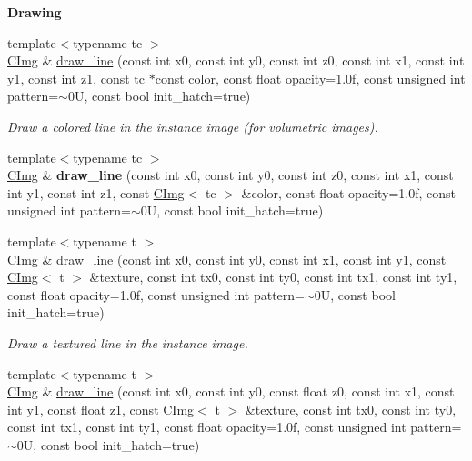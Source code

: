 \begin{Indent}{\bf Drawing}
\begin{DoxyCompactItemize}
\item 
{\footnotesize template$<$typename tc $>$ }\\\hyperlink{structcimg__library_1_1_c_img}{C\-Img} \& \hyperlink{structcimg__library_1_1_c_img_a1e4ced0b3527565e460348e4efd25db7}{draw\-\_\-line} (const int x0, const int y0, const int z0, const int x1, const int y1, const int z1, const tc $\ast$const color, const float opacity=1.\-0f, const unsigned int pattern=$\sim$0\-U, const bool init\-\_\-hatch=true)
\begin{DoxyCompactList}\small\item\em Draw a colored line in the instance image (for volumetric images). \end{DoxyCompactList}\item 
\hypertarget{structcimg__library_1_1_c_img_aba77ba7c6490b9e8ca30ee80bcc7d21f}{{\footnotesize template$<$typename tc $>$ }\\\hyperlink{structcimg__library_1_1_c_img}{C\-Img} \& {\bfseries draw\-\_\-line} (const int x0, const int y0, const int z0, const int x1, const int y1, const int z1, const \hyperlink{structcimg__library_1_1_c_img}{C\-Img}$<$ tc $>$ \&color, const float opacity=1.\-0f, const unsigned int pattern=$\sim$0\-U, const bool init\-\_\-hatch=true)}\label{structcimg__library_1_1_c_img_aba77ba7c6490b9e8ca30ee80bcc7d21f}

\item 
{\footnotesize template$<$typename t $>$ }\\\hyperlink{structcimg__library_1_1_c_img}{C\-Img} \& \hyperlink{structcimg__library_1_1_c_img_ad6ff011a6fd8ed8937b767d41c82a293}{draw\-\_\-line} (const int x0, const int y0, const int x1, const int y1, const \hyperlink{structcimg__library_1_1_c_img}{C\-Img}$<$ t $>$ \&texture, const int tx0, const int ty0, const int tx1, const int ty1, const float opacity=1.\-0f, const unsigned int pattern=$\sim$0\-U, const bool init\-\_\-hatch=true)
\begin{DoxyCompactList}\small\item\em Draw a textured line in the instance image. \end{DoxyCompactList}\item 
\hypertarget{structcimg__library_1_1_c_img_a9a4b40e161a7a430c23998b123e66714}{{\footnotesize template$<$typename t $>$ }\\\hyperlink{structcimg__library_1_1_c_img}{C\-Img} \& \hyperlink{structcimg__library_1_1_c_img_a9a4b40e161a7a430c23998b123e66714}{draw\-\_\-line} (const int x0, const int y0, const float z0, const int x1, const int y1, const float z1, const \hyperlink{structcimg__library_1_1_c_img}{C\-Img}$<$ t $>$ \&texture, const int tx0, const int ty0, const int tx1, const int ty1, const float opacity=1.\-0f, const unsigned int pattern=$\sim$0\-U, const bool init\-\_\-hatch=true)}\label{structcimg__library_1_1_c_img_a9a4b40e161a7a430c23998b123e66714}


\end{DoxyCompactItemize}
\end{Indent}
